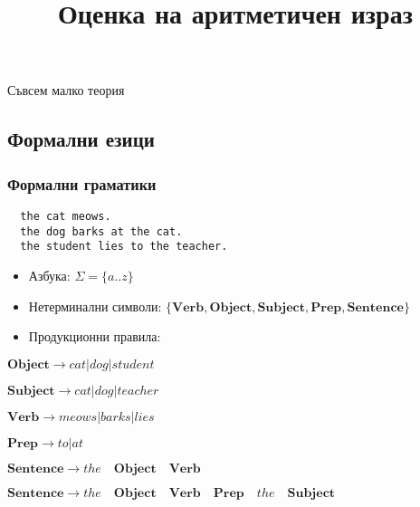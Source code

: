 \documentclass{beamer}
\begin{document}
\title[Дърво на израза]{Оценка на аритметичен израз}
\frame{\titlepage}

\begin{frame}
  \centerline{Съвсем малко теория}
\end{frame}
  
  
  \subsection{Формални езици}
  
  
  \begin{frame}[fragile]
  \frametitle{Формални граматики}
  
  \begin{verbatim}
  the cat meows.
  the dog barks at the cat.
  the student lies to the teacher.
  \end{verbatim}
  
  \pause
  
  \begin{itemize}
    \item Азбука: $\Sigma=\{a..z\}$
    \item Нетерминални символи: $\{\mathbf{Verb},\mathbf{Object},\mathbf{Subject}, \mathbf{Prep}, \mathbf{Sentence}\}$
    \item Продукционни правила:
  \end{itemize}
  
  \pause
  
  $\mathbf{Object} \rightarrow cat | dog | student$
  
  $\mathbf{Subject} \rightarrow cat | dog | teacher$
  
  $\mathbf{Verb} \rightarrow meows | barks | lies$
  
  $\mathbf{Prep} \rightarrow to | at$
  
  $\mathbf{Sentence} \rightarrow the  \quad \mathbf{Object} \quad  \mathbf{Verb}$
  
  $\mathbf{Sentence} \rightarrow the \quad \mathbf{Object}  \quad\mathbf{Verb}  \quad\mathbf{Prep} \quad the \quad \mathbf{Subject}$
  
  
  
  \end{frame}
  
\end{document}

